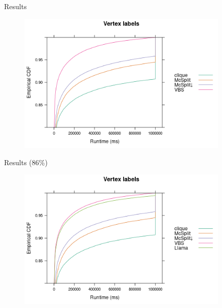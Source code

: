 \documentclass{beamer}
\begin{document}
\begin{frame}{Results}
  \begin{figure}
    \centering
    \includegraphics[width=0.9\textwidth]{../dissertation/images/ecdf_vertex_labels.png}
  \end{figure}
\end{frame}

\begin{frame}{Results (86\%)}
  \begin{figure}
    \centering
    \includegraphics[width=0.9\textwidth]{../dissertation/images/ecdf_vertex_labels_llama.png}
  \end{figure}
\end{frame}
\end{document}
